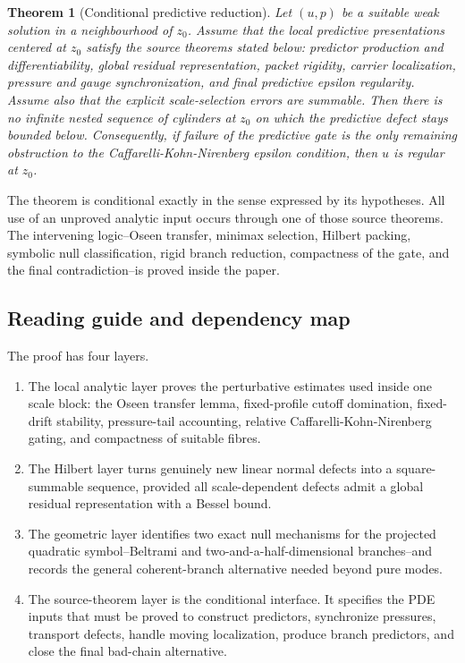 \documentclass[11pt]{article}
\newtheorem{theorem}{Theorem}[section]
\begin{document}
\begin{theorem}[Conditional predictive reduction]
Let \((u,p)\) be a suitable weak solution in a neighbourhood of \(z_0\).  Assume
 that the local predictive presentations centered at \(z_0\) satisfy the source
theorems stated below: predictor production and differentiability,
global residual representation, packet rigidity, carrier localization, pressure
and gauge synchronization, and final predictive epsilon regularity.  Assume also
that the explicit scale-selection errors are summable.  Then there is no
infinite nested sequence of cylinders at \(z_0\) on which the predictive defect
stays bounded below.  Consequently, if failure of the predictive gate is the only
remaining obstruction to the Caffarelli-Kohn-Nirenberg epsilon condition, then
\(u\) is regular at \(z_0\).
\end{theorem}

The theorem is conditional exactly in the sense expressed by its hypotheses.  All
use of an unproved analytic input occurs through one of those source theorems.
The intervening logic--Oseen transfer, minimax selection, Hilbert packing,
symbolic null classification, rigid branch reduction, compactness of the gate,
and the final contradiction--is proved inside the paper.

\subsection*{Reading guide and dependency map}

The proof has four layers.
\begin{enumerate}[label=(\roman*)]
\item The local analytic layer proves the perturbative estimates used inside one
scale block: the Oseen transfer lemma, fixed-profile cutoff domination,
fixed-drift stability, pressure-tail accounting, relative
Caffarelli-Kohn-Nirenberg gating, and compactness of suitable fibres.
\item The Hilbert layer turns genuinely new linear normal defects into a
square-summable sequence, provided all scale-dependent defects admit a global
residual representation with a Bessel bound.
\item The geometric layer identifies two exact null mechanisms for the projected
quadratic symbol--Beltrami and two-and-a-half-dimensional branches--and records
the general coherent-branch alternative needed beyond pure modes.
\item The source-theorem layer is the conditional interface.  It specifies the
PDE inputs that must be proved to construct predictors, synchronize pressures,
transport defects, handle moving localization, produce branch predictors, and
close the final bad-chain alternative.
\end{enumerate}
\end{document}
